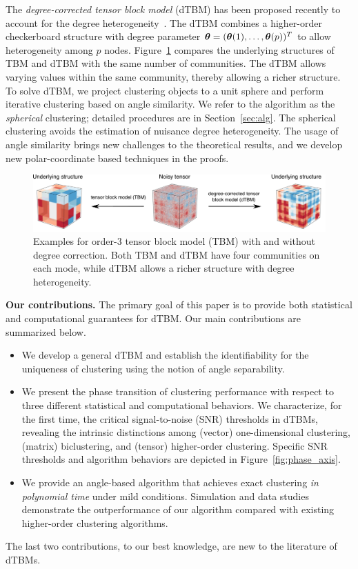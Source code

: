 \documentclass[lettersize,onecolumn,journal]{IEEEtran}
\theoremstyle{definition}
\theoremstyle{definition}
\begin{document}
The \emph{degree-corrected tensor block model} (dTBM) has been proposed recently to account for the degree heterogeneity~\citep{ke2019community}. The dTBM combines a higher-order checkerboard structure with degree parameter $\boldsymbol{\theta}=(\boldsymbol{\theta}(1),\ldots,\boldsymbol{\theta}(p))^T$ to allow heterogeneity among $p$ nodes.  Figure~\ref{fig:intro} compares the underlying structures of TBM and dTBM with the same number of communities. The dTBM allows varying values within the same community, thereby allowing a richer structure. To solve dTBM, we project clustering objects to a unit sphere and perform iterative clustering based on angle similarity. We refer to the algorithm as the \textit{spherical} clustering; detailed procedures are in Section~\ref{sec:alg}. The spherical clustering avoids the estimation of nuisance degree heterogeneity. The usage of angle similarity brings new challenges to the theoretical results, and we develop new polar-coordinate based techniques in the proofs. 

\begin{figure}[t]
    \centering
    \includegraphics[width = .9\textwidth]{intro2_arxiv.pdf}
    \caption{Examples for order-3 tensor block model (TBM) with and without degree correction. Both TBM and dTBM have four communities on each mode, while dTBM allows a richer structure with degree heterogeneity.
    }
    \label{fig:intro}
\end{figure}

{\bf Our contributions.} The primary goal of this paper is to provide both statistical and computational guarantees for dTBM. Our main contributions are summarized below.
\begin{itemize}[leftmargin=*]

 \item We develop a general dTBM and establish the identifiability for the uniqueness of clustering using the notion of angle separability.
 
\item  We present the phase transition of clustering performance with respect to three different statistical and computational behaviors.  We characterize, for the first time, the critical signal-to-noise (SNR) thresholds in dTBMs, revealing the intrinsic distinctions among (vector) one-dimensional clustering, (matrix) biclustering, and (tensor) higher-order clustering. Specific SNR thresholds and algorithm behaviors are depicted in  Figure~\ref{fig:phase_axis}. 
        
 \item We provide an angle-based algorithm that achieves exact clustering \emph{in polynomial time} under mild conditions. Simulation and data studies demonstrate the outperformance of our algorithm compared with existing higher-order clustering algorithms. 
\end{itemize}
The last two contributions, to our best knowledge, are new to the literature of dTBMs. 
\end{document}
